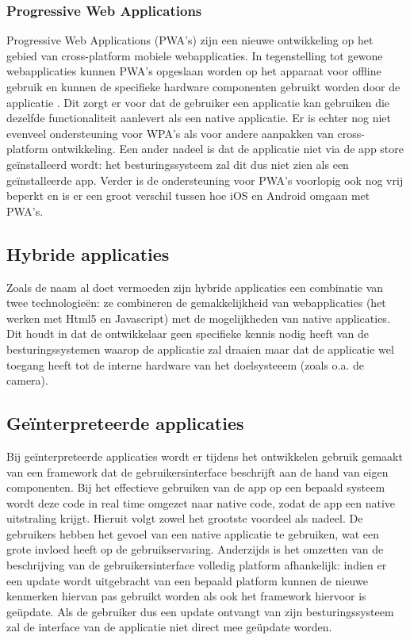 \subsubsection{Progressive Web Applications}
\label{subsec:pwa}

Progressive Web Applications (PWA's) zijn een nieuwe ontwikkeling op het gebied van cross-platform mobiele webapplicaties. In tegenstelling tot gewone webapplicaties kunnen PWA's opgeslaan worden op het apparaat voor offline gebruik en kunnen de specifieke hardware componenten gebruikt worden door de applicatie \autocite{Majchrzak2018}. Dit zorgt er voor dat de gebruiker een applicatie kan gebruiken die dezelfde functionaliteit aanlevert als een native applicatie. Er is echter nog niet evenveel ondersteuning voor WPA's als voor andere aanpakken van cross-platform ontwikkeling. Een ander nadeel is dat de applicatie niet via de app store geïnstalleerd wordt: het besturingssysteem zal dit dus niet zien als een geïnstalleerde app. Verder is de ondersteuning voor PWA's voorlopig ook nog vrij beperkt en is er een groot verschil tussen hoe iOS en Android omgaan met PWA's.

\subsection{Hybride applicaties}
\label{subsec:hybridApps}

Zoals de naam al doet vermoeden zijn hybride applicaties een combinatie van twee technologieën: ze combineren de gemakkelijkheid van webapplicaties (het werken met Html5 en Javascript) met de mogelijkheden van native applicaties. Dit houdt in dat de ontwikkelaar geen specifieke kennis nodig heeft van de besturingssystemen waarop de applicatie zal draaien maar dat de applicatie wel toegang heeft tot de interne hardware van het doelsysteeem (zoals o.a. de camera). 

\subsection{Geïnterpreteerde applicaties}
\label{subsec:interpretedApps}

Bij geïnterpreteerde applicaties wordt er tijdens het ontwikkelen gebruik gemaakt van een framework dat de gebruikersinterface beschrijft aan de hand van eigen componenten. Bij het effectieve gebruiken van de app op een bepaald systeem wordt deze code in real time omgezet naar native code, zodat de app een native uitstraling krijgt. Hieruit volgt zowel het grootste voordeel als nadeel. De gebruikers hebben het gevoel van een native applicatie te gebruiken, wat een grote invloed heeft op de gebruikservaring. Anderzijds is het omzetten van de beschrijving van de gebruikersinterface volledig platform afhankelijk: indien er een update wordt uitgebracht van een bepaald platform kunnen de nieuwe kenmerken hiervan pas gebruikt worden als ook het framework hiervoor is geüpdate. Als de gebruiker dus een update ontvangt van zijn besturingssysteem zal de interface van de applicatie niet direct mee geüpdate worden.

